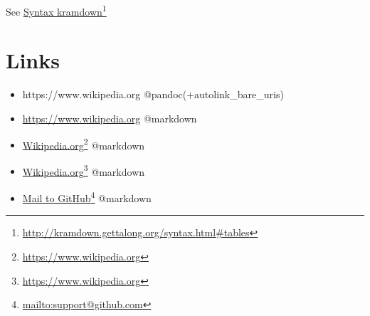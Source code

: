 See \href{http://kramdown.gettalong.org/syntax.html#tables}{Syntax \textbar{} kramdown}\footnote{\href{http://kramdown.gettalong.org/syntax.html\#tables}{http:/\slash kramdown.gettalong.org\slash syntax.html\#tables}} 

\section{Links}
\label{links}

\begin{itemize}
\item https:\slash \slash www.wikipedia.org @pandoc(+autolink\_bare\_uris)

\item \href{https://www.wikipedia.org}{https:/\slash www.wikipedia.org} @markdown

\item \href{https://www.wikipedia.org}{Wikipedia.org}\footnote{\href{https://www.wikipedia.org}{https:/\slash www.wikipedia.org}} @markdown

\item \href{https://www.wikipedia.org}{Wikipedia.org}\footnote{\href{https://www.wikipedia.org}{https:/\slash www.wikipedia.org}} @markdown

\item \href{mailto:support@github.com}{Mail to GitHub}\footnote{\href{mailto:support@github.com}{mailto:support@github.com}} @markdown

\end{itemize}

